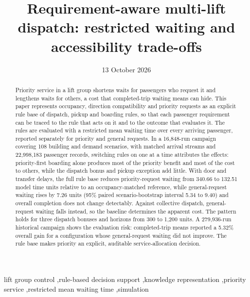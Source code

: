 \documentclass[preprint,12pt]{elsarticle}
\date{13 October 2026}
\begin{document}
\begin{frontmatter}
\title{Requirement-aware multi-lift dispatch: restricted waiting and accessibility trade-offs}
\begin{abstract}
Priority service in a lift group shortens waits for passengers who request it and lengthens waits for others, a cost that completed-trip waiting means can hide. This paper represents occupancy, direction compatibility and priority requests as an explicit rule base of dispatch, pickup and boarding rules, so that each passenger requirement can be traced to the rule that acts on it and to the outcome that evaluates it. The rules are evaluated with a restricted mean waiting time over every arriving passenger, reported separately for priority and general requests. In a 16,848-run campaign covering 108 building and demand scenarios, with matched arrival streams and 22,998,183 passenger records, switching rules on one at a time attributes the effects: priority-first boarding alone produces most of the priority benefit and most of the cost to others, while the dispatch bonus and pickup exception add little. With door and transfer delays, the full rule base reduces priority-request waiting from 340.66 to 132.51 model time units relative to an occupancy-matched reference, while general-request waiting rises by 7.26 units (95\% paired scenario-bootstrap interval 5.34 to 9.40) and overall completion does not change detectably. Against collective dispatch, general-request waiting falls instead, so the baseline determines the apparent cost. The pattern holds for three dispatch bonuses and horizons from 300 to 1,200 units. A 279,936-run historical campaign shows the evaluation risk: completed-trip means reported a 5.32\% overall gain for a configuration whose general-request waiting did not improve. The rule base makes priority an explicit, auditable service-allocation decision.
\end{abstract}
\begin{keyword}lift group control \sep rule-based decision support \sep knowledge representation \sep priority service \sep restricted mean waiting time \sep simulation\end{keyword}
\end{frontmatter}


\clearpage\appendix
\end{document}

